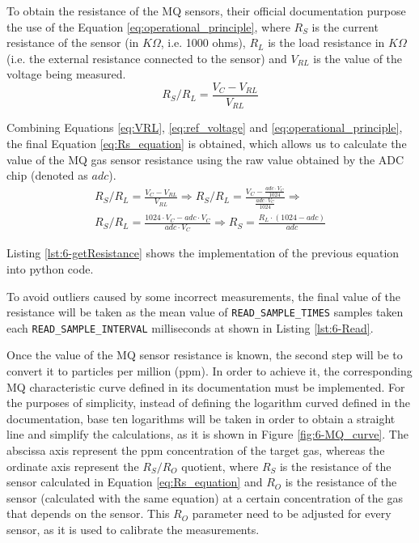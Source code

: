 To obtain the resistance of the MQ sensors, their official documentation \cite{MQ7,MQ2} purpose the use of the Equation \ref{eq:operational_principle}, where ${R}_{S}$ is the current resistance of the sensor (in $K\Omega$, i.e. 1000 ohms), ${R}_{L}$ is the load resistance in $K\Omega$ (i.e. the external resistance connected to the sensor) and ${V}_{RL}$ is the value of the voltage being measured. 
\begin{equation} \label{eq:operational_principle}
{ { R }_{ S } }/{ { R }_{ L } }=\frac { { V }_{ C }-V_{ RL } }{ V_{ RL } } 
\end{equation}

Combining Equations \ref{eq:VRL}, \ref{eq:ref_voltage} and \ref{eq:operational_principle}, the final Equation \ref{eq:Rs_equation} is obtained, which allows us to calculate the value of the MQ gas sensor resistance using the raw value obtained by the \ac{ADC} chip (denoted as $adc$).
\begin{equation} \label{eq:Rs_equation}
\begin{aligned}
{ { R }_{ S } }/{ { R }_{ L } }=\frac { { V }_{ C }-V_{ RL } }{ V_{ RL } } \Rightarrow 
{ { R }_{ S } }/{ { R }_{ L } }=\frac { { V }_{ C }-\frac { adc\cdot { V }_{ C } }{ 1024 }  }{ \frac { adc\cdot { V }_{ C } }{ 1024 }  } \Rightarrow \\
{ { R }_{ S } }/{ { R }_{ L } }=\frac { 1024\cdot { V }_{ C }-adc\cdot { V }_{ C } }{ adc\cdot { V }_{ C } } \Rightarrow 
{ R }_{ S }=\frac {  { R }_{ L } \cdot (1024-adc) }{ adc } 
\end{aligned}
\end{equation}

Listing \ref{lst:6-getResistance} shows the implementation of the previous equation into python code.


To avoid outliers caused by some incorrect measurements, the final value of the resistance will be taken as the mean value of \texttt{READ\_SAMPLE\_TIMES} samples taken each \texttt{READ\_SAMPLE\_INTERVAL} milliseconds at shown in Listing \ref{lst:6-Read}.

Once the value of the MQ sensor resistance is known, the second step will be to convert it to particles per million (ppm). In order to achieve it, the corresponding MQ characteristic curve defined in its documentation must be implemented. For the purposes of simplicity, instead of defining the logarithm curved defined in the documentation, base ten logarithms will be taken in order to obtain a straight line and simplify the calculations, as it is shown in Figure \ref{fig:6-MQ_curve}. The abscissa axis represent the ppm concentration of the target gas, whereas the ordinate axis represent the ${R}_{S}/{R}_{O}$ quotient, where ${R}_{S}$ is the resistance of the sensor calculated in Equation \ref{eq:Rs_equation} and ${R}_{O}$ is the resistance of the sensor (calculated with the same equation) at a certain concentration of the gas that depends on the sensor. This ${R}_{O}$ parameter need to be adjusted for every sensor, as it is used to calibrate the measurements.

